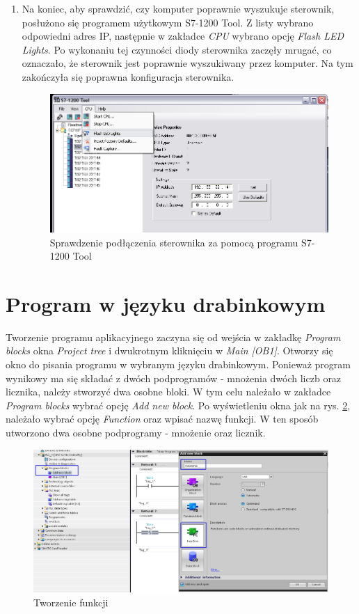 \documentclass[12pt]{article}
\begin{document}
\begin{enumerate}
    \item Na koniec, aby sprawdzić, czy komputer poprawnie wyszukuje sterownik, posłużono się programem użytkowym S7-1200 Tool. Z listy wybrano odpowiedni adres IP, następnie w zakładce \textit{CPU} wybrano opcję \textit{Flash LED Lights}. Po wykonaniu tej czynności diody sterownika zaczęły mrugać, co oznaczało, że sterownik jest poprawnie wyszukiwany przez komputer. Na tym zakończyła się poprawna konfiguracja sterownika.
    \begin{figure}[H]
        \centering
        \includegraphics[scale=0.55]{./zdj/flash_led.png}
        \caption{Sprawdzenie podłączenia sterownika za pomocą programu S7-1200 Tool}
        \label{flash}
    \end{figure} 

\end{enumerate}

\section{Program w języku drabinkowym}
Tworzenie programu aplikacyjnego zaczyna się od wejścia w zakładkę \textit{Program
blocks} okna \textit{Project tree} i dwukrotnym kliknięciu w \textit{Main [OB1]}. Otworzy się okno do pisania programu w wybranym języku drabinkowym. Ponieważ program wynikowy ma się składać z dwóch podprogramów - mnożenia dwóch liczb oraz licznika, należy stworzyć dwa osobne bloki. W tym celu należało w zakładce \textit{Program blocks} wybrać opcję \textit{Add new block}. Po wyświetleniu okna jak na rys. \ref{bloki}, należało wybrać opcję \textit{Function} oraz wpisać nazwę funkcji. W ten sposób utworzono dwa osobne podprogramy - mnożenie oraz licznik.

\begin{figure}[H]
    \centering
    \includegraphics[scale=0.4]{./zdj/blok_mnozenie.png}
    \caption{Tworzenie funkcji}
    \label{bloki}
\end{figure} 
\end{document}

